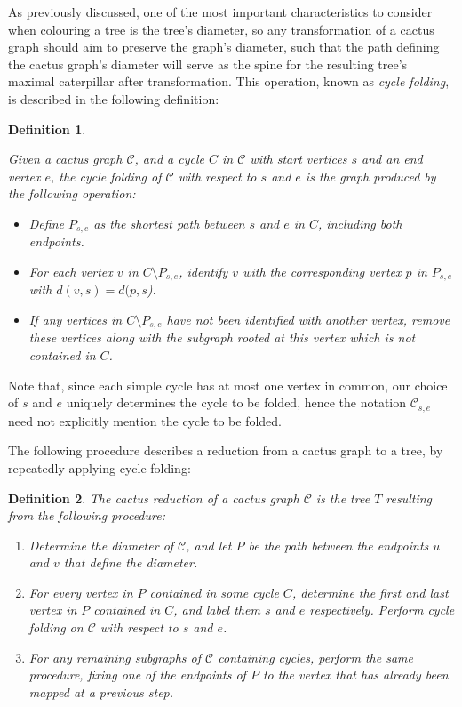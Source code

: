 \documentclass{mpaper}
\newtheorem{definition}{Definition}[section]
\begin{document}
As previously discussed, one of the most important characteristics to consider when colouring a tree is the tree's diameter, so any transformation of a cactus graph should aim to preserve the graph's diameter, such that the path defining the cactus graph's diameter will serve as the spine for the resulting tree's maximal caterpillar after transformation. This operation, known as \emph{cycle folding}, is described in the following definition:

\begin{definition}
\label{def/cycle-folding}


Given a cactus graph $\mathcal{C}$, and a cycle $C$ in $\mathcal{C}$ with start vertices $s$ and an end vertex $e$, the \emph{cycle folding} of $\mathcal{C}$ with respect to $s$ and $e$ is the graph produced by the following operation:

\begin{itemize}
  \item Define $P_{s,e}$ as the shortest path between $s$ and $e$ in $C$, including both endpoints.
  \item For each vertex $v$ in $C \setminus P_{s,e}$, identify $v$ with the corresponding vertex $p$ in $P_{s,e}$ with $d(v,s) = d(p,s$).
  \item If any vertices in $C \setminus P_{s,e}$ have not been identified with another vertex, remove these vertices along with the subgraph rooted at this vertex which is not contained in $C$.
\end{itemize}

\end{definition}

Note that, since each simple cycle has at most one vertex in common, our choice of $s$ and $e$ uniquely determines the cycle to be folded, hence the notation $\mathcal{C}_{s,e}$ need not explicitly mention the cycle to be folded.

The following procedure describes a reduction from a cactus graph to a tree, by repeatedly applying cycle folding:

\begin{definition}
  The \emph{cactus reduction} of a cactus graph $\mathcal{C}$ is the tree $T$ resulting from the following procedure:

  \begin{enumerate}
    \item Determine the diameter of $\mathcal{C}$, and let $P$ be the path between the endpoints $u$ and $v$ that define the diameter.
    \item For every vertex in $P$ contained in some cycle $C$, determine the first and last vertex in $P$ contained in $C$, and label them $s$ and $e$ respectively. Perform cycle folding on $\mathcal{C}$ with respect to $s$ and $e$.
    \item For any remaining subgraphs of $\mathcal{C}$ containing cycles, perform the same procedure, fixing one of the endpoints of $P$ to the vertex that has already been mapped at a previous step.
  \end{enumerate}
\end{definition}
\end{document}
